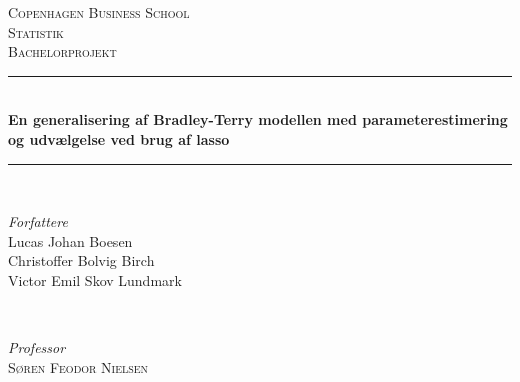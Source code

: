 \documentclass[11pt,a4paper]{article}
\begin{document}
\begin{titlepage} %
	\newcommand{\HRule}{\rule{\linewidth}{0.5mm}} %
	
	\center %
	
	
	\textsc{\LARGE Copenhagen Business School}\\[1.5cm] %
	
	\textsc{\Large Statistik}\\[0.5cm] %
	
	\textsc{\large Bachelorprojekt}\\[0.5cm] %
	
	
	\HRule\\[0.4cm]
	
	{\huge\bfseries En generalisering af Bradley-Terry modellen med parameterestimering og udvælgelse ved brug af lasso}\\[0.4cm] %
	
	\HRule\\[1.5cm]
	
	
	\begin{minipage}{0.4\textwidth}
		\begin{flushleft}
			\large
			\textit{Forfattere}\\
			Lucas Johan Boesen\\ %
			Christoffer Bolvig Birch\\ %
			Victor Emil Skov Lundmark\\ %
		\end{flushleft}
	\end{minipage}
	~
	\begin{minipage}{0.4\textwidth}
		\begin{flushright}
			\large
			\textit{Professor}\\
			\textsc{Søren Feodor Nielsen}\\
			\textsc{}\\
			\textsc{}\\%
		\end{flushright}
	\end{minipage}
	

\end{titlepage}
\end{document}
